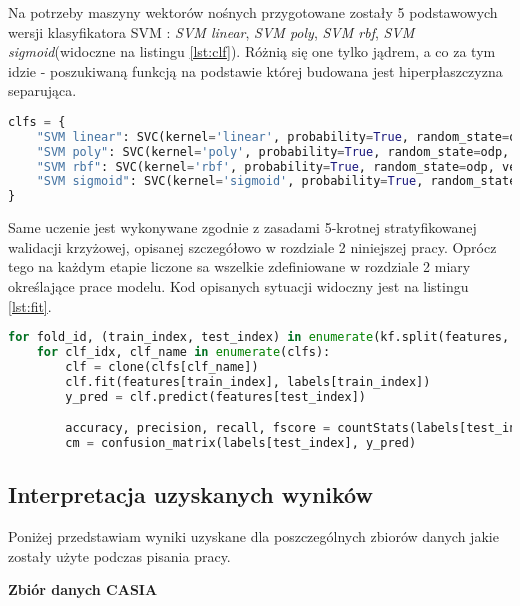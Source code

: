Na potrzeby maszyny wektorów nośnych przygotowane zostały 5 podstawowych wersji klasyfikatora SVM \cite{hands_on}: \textit{SVM linear}, \textit{SVM poly}, \textit{SVM rbf}, \textit{SVM sigmoid}(widoczne na listingu \ref{lst:clf}). Różnią się one tylko jądrem, a co za tym idzie - poszukiwaną funkcją na podstawie której budowana jest hiperpłaszczyzna separująca.

\begin{lstlisting}[language=Python, caption=Możliwe klasyfikactory dla SVM'a, captionpos=b, label={lst:clf}]
clfs = {
	"SVM linear": SVC(kernel='linear', probability=True, random_state=odp, verbose=True),
	"SVM poly": SVC(kernel='poly', probability=True, random_state=odp, verbose=True),
	"SVM rbf": SVC(kernel='rbf', probability=True, random_state=odp, verbose=True),
	"SVM sigmoid": SVC(kernel='sigmoid', probability=True, random_state=odp,verbose=True)
}
\end{lstlisting}

Same uczenie jest wykonywane zgodnie z zasadami 5-krotnej stratyfikowanej walidacji krzyżowej, opisanej szczegółowo w rozdziale 2 niniejszej pracy. Oprócz tego na każdym etapie liczone sa wszelkie zdefiniowane w rozdziale 2 miary określające prace modelu. Kod opisanych sytuacji widoczny jest na listingu \ref{lst:fit}.

\begin{lstlisting}[language=Python, caption=Trenowanie modelów, captionpos=b, label={lst:fit}]
for fold_id, (train_index, test_index) in enumerate(kf.split(features, labels)):
	for clf_idx, clf_name in enumerate(clfs):
		clf = clone(clfs[clf_name])
		clf.fit(features[train_index], labels[train_index])
		y_pred = clf.predict(features[test_index])

		accuracy, precision, recall, fscore = countStats(labels[test_index], y_pred)
		cm = confusion_matrix(labels[test_index], y_pred)
\end{lstlisting}

\subsection{Interpretacja uzyskanych wyników}

Poniżej przedstawiam wyniki uzyskane dla poszczególnych zbiorów danych jakie zostały użyte podczas pisania pracy.

\textbf{Zbiór danych CASIA} \\

